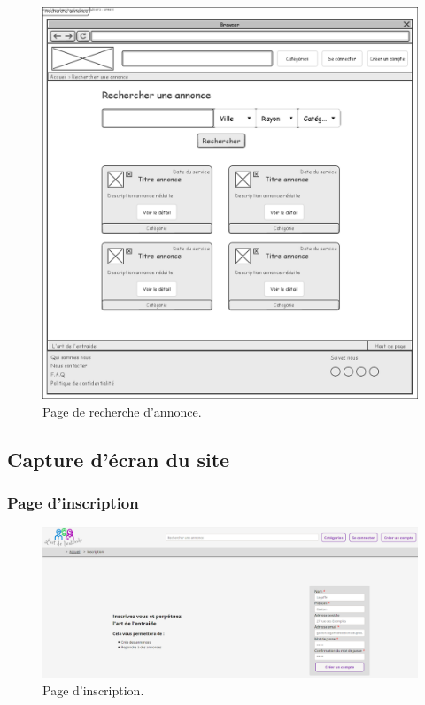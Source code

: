 \documentclass[a4paper,11pt]{article}
\begin{document}
\begin{figure}[H]
  \includegraphics[width=\linewidth]{../Conception/maquette/maquette-recherche.png}
  \caption{Page de recherche d'annonce.}
  \label{fig:maquette-recherche}
\end{figure}
\newpage


\subsection{Capture d'écran du site}


\subsubsection{Page d'inscription}

\begin{figure}[H]
  \includegraphics[width=\linewidth]{images/page-inscription.png}
  \caption{Page d'inscription.}
  \label{fig:page-inscription}
\end{figure}
\end{document}
